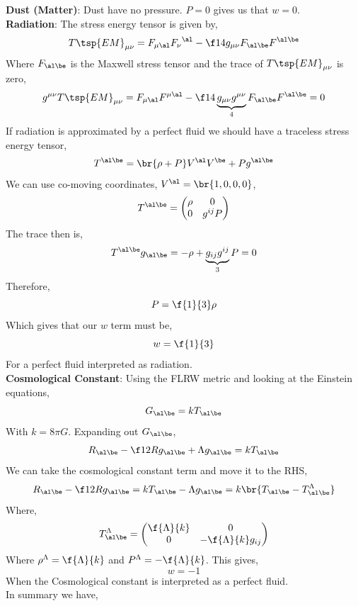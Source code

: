 \documentclass{article}
\newcommand{\pmtrx}[1]{
    \begin{pmatrix}
    #1
    \end{pmatrix}
}
\begin{document}
\textbf{Dust (Matter)}: Dust have no pressure. $P= 0$ gives us that $w = 0$.\\

\textbf{Radiation}: The stress energy tensor is given by,
\[ T\tsp{EM}_{\mu\nu} = F_{\mu\al}{F_{\nu}}^{\al} - \f14 g_{\mu\nu} F_{\al\be} F^{\al\be} \]
Where $F_{\al\be}$ is the Maxwell stress tensor and the trace of ${T\tsp{EM}}_{\mu\nu}$ is zero,
\[ g^{\mu\nu}T\tsp{EM}_{\mu\nu} = F_{\mu\al}F^{\mu\al} - \f14 \underbrace{g_{\mu\nu}g^{\mu\nu}}_{4} F_{\al\be} F^{\al\be} = 0 \]
If radiation is approximated by a perfect fluid we should have a traceless stress energy tensor,
\[ T^{\al\be} = \br{\rho + P}V^\al V^\be + P g^{\al\be} \]
We can use co-moving coordinates, $V^\al = \br{1, 0, 0, 0}$,
\[ T^{\al\be} = \pmtrx{\rho & 0 \\ 0 & g^{ij}P} \]
The trace then is,
\[ T^{\al\be}g_{\al\be} = -\rho + \underbrace{g_{ij}g^{ij}}_{3}P = 0 \]
Therefore,
\[ P = \f{1}{3} \rho \]
Which gives that our $w$ term must be,
\[ w = \f{1}{3} \]
For a perfect fluid interpreted as radiation. \\

\textbf{Cosmological Constant}:
Using the FLRW metric and looking at the Einstein equations,
\[ G_{\al\be} = k T_{\al\be} \]
With $k = 8\pi G$. Expanding out $G_{\al\be}$,
\[ R_{\al\be} - \f12 R g_{\al\be} + \Lambda g_{\al\be} = k T_{\al\be} \]
We can take the cosmological constant term and move it to the RHS,
\[ R_{\al\be} - \f12 R g_{\al\be} = k T_{\al\be} - \Lambda g_{\al\be} = k \br{T_{\al\be} - T^{\Lambda}_{\al\be}} \]
Where,
\[ T^{\Lambda}_{\al\be} = \pmtrx{ \f{\Lambda}{k} & 0 \\ 0 & -\f{\Lambda}{k} g_{ij}} \]
Where $\rho^{\Lambda} = \f{\Lambda}{k}$ and $P^{\Lambda} = -\f{\Lambda}{k}$. This gives,
\[ w = -1 \]
When the Cosmological constant is interpreted as a perfect fluid.\\

In summary we have,
\end{document}
